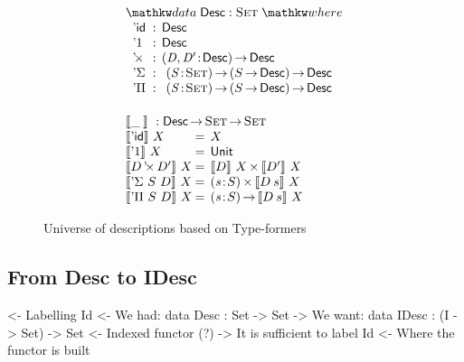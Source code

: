\begin{figure}

\[\stk{
\begin{array}{ll}
\stk{
\data \Desc : \Set \where \\
\;\;\begin{array}{@{}l@{\::\:\:}l@{\quad}l}
    \DId            & \Desc                                   \\
    \DUnit          & \Desc                                   \\
    \DProd{}{}      & \PI{\V{D}, \V{D'}}{\Desc} \Desc         \\
    \DSigma         & \PI{\V{S}}{\Set} \PIS{S \To \Desc} \Desc \\
    \DPi            & \PI{\V{S}}{\Set} \PIS{S \To \Desc} \Desc 
\end{array}
}
\vspace{0.2in}
\\
\stk{
\descop{\_\:}{} : \Desc \To \Set \To \Set \\
\begin{array}{@{}l@{\:=\:\:}ll}
\descop{\DId}{X}          &  X                                           \\
\descop{\DUnit}{X}        &  \Unit                                       \\
\descop{\DProd{D}{D'}}{X} &  \TIMES{\descop{D}{X}}{\descop{D'}{X}}       \\
\descop{\DSigma{S}{D}}{X} &  \SIGMA{\V{s}}{S} \descop{D\: s}{X}                \\
\descop{\DPi{S}{D}}{X}    &  \PI{\V{s}}{S} \descop{D\: s}{X}            
\end{array}
}
\end{array}
}\]

\caption{Universe of descriptions based on Type-formers}
\label{fig:type-former-desc}

\end{figure}

\subsection{From Desc to IDesc}

\begin{wstructure}
<- Labelling Id
    <- We had: data Desc : Set -> Set
    -> We want: data IDesc : (I -> Set) -> Set
        <- Indexed functor (?)
        -> It is sufficient to label Id
            <- Where the functor is built
\end{wstructure}

